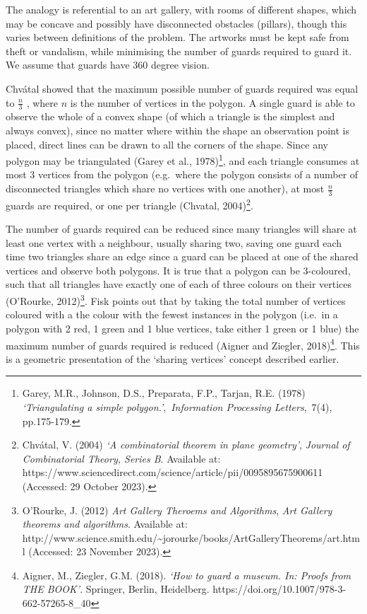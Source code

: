 \documentclass[
]{article}
\begin{document}
The analogy is referential to an art gallery, with rooms of different
shapes, which may be concave and possibly have disconnected obstacles
(pillars), though this varies between definitions of the problem. The
artworks must be kept safe from theft or vandalism, while minimising the
number of guards required to guard it. We assume that guards have 360
degree vision.

Chvátal showed that the maximum possible number of guards required was
equal to \(\frac{n}{3}\) , where \(n\) is the number of vertices in the
polygon. A single guard is able to observe the whole of a convex shape
(of which a triangle is the simplest and always convex), since no matter
where within the shape an observation point is placed, direct lines can
be drawn to all the corners of the shape. Since any polygon may be
triangulated (Garey et al., 1978)\footnote{Garey, M.R., Johnson, D.S.,
  Preparata, F.P., Tarjan, R.E. (1978) \emph{`Triangulating a simple
  polygon.'},~\emph{Information Processing Letters},~7(4), pp.175-179.},
and each triangle consumes at most 3 vertices from the polygon
(e.g.~where the polygon consists of a number of disconnected triangles
which share no vertices with one another), at most \(\frac{n}{3}\)
guards are required, or one per triangle (Chvatal, 2004)\footnote{Chvátal,
  V. (2004) \emph{`A combinatorial theorem in plane geometry'},
  \emph{Journal of Combinatorial Theory, Series B}. Available at:
  https://www.sciencedirect.com/science/article/pii/0095895675900611
  (Accessed: 29 October 2023).}.

The number of guards required can be reduced since many triangles will
share at least one vertex with a neighbour, usually sharing two, saving
one guard each time two triangles share an edge since a guard can be
placed at one of the shared vertices and observe both polygons. It is
true that a polygon can be 3-coloured, such that all triangles have
exactly one of each of three colours on their vertices (O'Rourke,
2012)\footnote{O'Rourke, J. (2012) \emph{Art Gallery Theroems and
  Algorithms}, \emph{Art Gallery theorems and algorithms}. Available at:
  http://www.science.smith.edu/\textasciitilde jorourke/books/ArtGalleryTheorems/art.html
  (Accessed: 23 November 2023).}. Fisk points out that by taking the
total number of vertices coloured with a the colour with the fewest
instances in the polygon (i.e.~in a polygon with 2 red, 1 green and 1
blue vertices, take either 1 green or 1 blue) the maximum number of
guards required is reduced (Aigner and Ziegler, 2018)\footnote{Aigner,
  M., Ziegler, G.M. (2018). \emph{`How to guard a museum. In: Proofs
  from THE BOOK'}. Springer, Berlin, Heidelberg.
  https://doi.org/10.1007/978-3-662-57265-8\_40}. This is a geometric
presentation of the `sharing vertices' concept described earlier.
\end{document}
